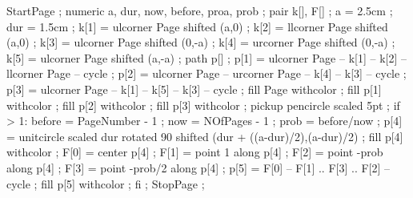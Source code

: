 



\definecolor [Item]            [s=.9]
\definecolor [a]               [s=.9]
\definecolor [c]               [r=.15,g=.15,b=.525]
\definecolor [b]               [r=.2,g=.2,b=.7]
\definecolor [d]               [s=.4]


StartPage ;
numeric a, dur, now, before, proa, prob ;
pair k[], F[] ;
a = 2.5cm ;
dur = 1.5cm ;
k[1] = ulcorner Page shifted (a,0) ;
k[2] = llcorner Page shifted (a,0) ;
k[3] = ulcorner Page shifted (0,-a) ;
k[4] = urcorner Page shifted (0,-a) ;
k[5] = ulcorner Page shifted (a,-a) ;
path p[] ;
p[1] = ulcorner Page -- k[1] -- k[2] -- llcorner Page -- cycle ;
p[2] = ulcorner Page -- urcorner Page -- k[4] -- k[3] -- cycle ;
p[3] = ulcorner Page -- k[1] -- k[5] -- k[3] -- cycle ;
fill Page withcolor  ;
fill p[1] withcolor  ;
fill p[2] withcolor  ;
fill p[3] withcolor  ;
pickup pencircle scaled 5pt ;
if \realfolio > 1:
	before = PageNumber - 1 ;
	now = NOfPages - 1 ;
	prob = before/now ;
	p[4] = unitcircle scaled dur rotated 90 shifted (dur + ((a-dur)/2),(a-dur)/2) ;
	fill p[4] withcolor  ;
	F[0] = center p[4] ;
	F[1] = point 1 along p[4] ;
	F[2] = point -prob along p[4] ;
	F[3] = point -prob/2 along p[4] ;
	p[5] = F[0] -- F[1] .. F[3] .. F[2] -- cycle ;
	fill p[5] withcolor  ;
fi ;
StopPage ;
\stopuseMPgraphic




